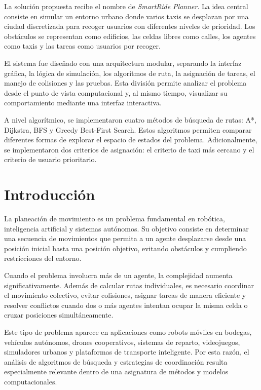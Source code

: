 \documentclass[12pt,a4paper]{article}
\begin{document}
La solución propuesta recibe el nombre de \textit{SmartRide Planner}. La idea central consiste en simular un entorno urbano donde varios taxis se desplazan por una ciudad discretizada para recoger usuarios con diferentes niveles de prioridad. Los obstáculos se representan como edificios, las celdas libres como calles, los agentes como taxis y las tareas como usuarios por recoger.

El sistema fue diseñado con una arquitectura modular, separando la interfaz gráfica, la lógica de simulación, los algoritmos de ruta, la asignación de tareas, el manejo de colisiones y las pruebas. Esta división permite analizar el problema desde el punto de vista computacional y, al mismo tiempo, visualizar su comportamiento mediante una interfaz interactiva.

A nivel algorítmico, se implementaron cuatro métodos de búsqueda de rutas: A*, Dijkstra, BFS y Greedy Best-First Search. Estos algoritmos permiten comparar diferentes formas de explorar el espacio de estados del problema. Adicionalmente, se implementaron dos criterios de asignación: el criterio de taxi más cercano y el criterio de usuario prioritario.

\section{Introducción}
\justifying

La planeación de movimiento es un problema fundamental en robótica, inteligencia artificial y sistemas autónomos. Su objetivo consiste en determinar una secuencia de movimientos que permita a un agente desplazarse desde una posición inicial hasta una posición objetivo, evitando obstáculos y cumpliendo restricciones del entorno.

Cuando el problema involucra más de un agente, la complejidad aumenta significativamente. Además de calcular rutas individuales, es necesario coordinar el movimiento colectivo, evitar colisiones, asignar tareas de manera eficiente y resolver conflictos cuando dos o más agentes intentan ocupar la misma celda o cruzar posiciones simultáneamente.

Este tipo de problema aparece en aplicaciones como robots móviles en bodegas, vehículos autónomos, drones cooperativos, sistemas de reparto, videojuegos, simuladores urbanos y plataformas de transporte inteligente. Por esta razón, el análisis de algoritmos de búsqueda y estrategias de coordinación resulta especialmente relevante dentro de una asignatura de métodos y modelos computacionales.
\end{document}

